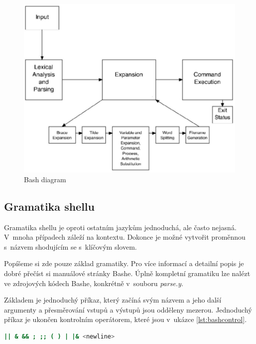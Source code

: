 \documentclass[thesis=M,czech]{FITthesis}[2012/06/26]
\begin{document}
\begin{figure}[htb]\centering
	\includegraphics[width=\textwidth]{./images/bash-article-diagram}
	\caption{Bash diagram \cite{bashdiagimg}}
	\label{fig:bash_diag}
\end{figure}




%
%
%
\subsection{Gramatika shellu}

Gramatika shellu je oproti ostatním jazykům jednoduchá, ale často nejasná. V~mnoha případech záleží na kontextu. Dokonce je možné vytvořit proměnnou s~názvem shodujícím se s~klíčovým slovem.

Popíšeme si zde pouze základ gramatiky. Pro více informací a detailní popis je dobré přečíst si manuálové stránky Bashe. Úplně kompletní gramatiku lze nalézt ve zdrojových kódech Bashe, konkrétně v~souboru \textit{parse.y}.

Základem je jednoduchý příkaz, který začíná svým názvem a jeho další argumenty a přesměrování vstupů a výstupů jsou odděleny mezerou. Jednoduchý příkaz je ukončen kontrolním operátorem, které jsou v~ukázce \ref{lst:bashcontrol}.

\noindent
\begin{minipage}{\linewidth}
\begin{lstlisting}[language=bash, caption={Kontrolní operátory v~Bashi}, label={lst:bashcontrol}]
|| & && ; ;; ( ) | |& <newline>
\end{lstlisting}
\end{minipage}
\end{document}
